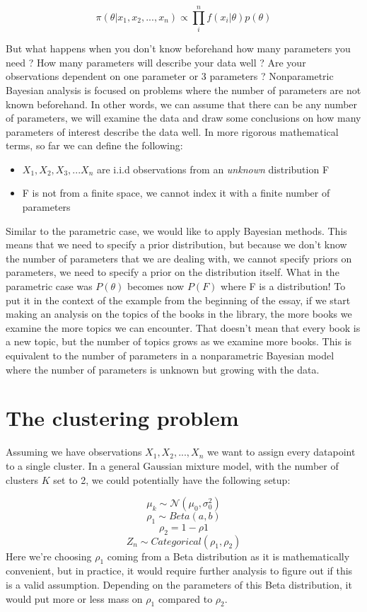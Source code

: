 \documentclass[12pt,a4paper]{article}
\begin{document}
$$\pi(\theta|x_{1}, x_{2}, ..., x_{n}) \propto \prod_{i}^{n}f(x_{i}|\theta)p(\theta)$$ 

But what happens when you don't know beforehand how many parameters you need ? How many parameters will describe
your data well ? Are your observations dependent on one parameter or 3 parameters ? Nonparametric Bayesian analysis
is focused on problems where the number of parameters are not known beforehand. In other words, we can assume that
there can be any number of parameters, we will examine the data and draw some conclusions on how many parameters of 
interest describe the data well. 
In more rigorous mathematical terms, so far we can define the following:

\begin{itemize}
    \item $X_{1}, X_{2}, X_{3}, ... X_{n}$ are i.i.d observations from an \textit{unknown} distribution F
    \item F is not from a finite space, we cannot index it with a finite number of parameters
\end{itemize}

Similar to the parametric case, we would like to apply Bayesian methods. This means that we need to 
specify a prior distribution, but because we don't know the number of parameters that we are dealing with,
we cannot specify priors on parameters, we need to specify a prior on the distribution itself. What in 
the parametric case was $P(\theta)$ becomes now $P(F)$ where F is a distribution! 
To put it in the context of the example from the beginning of the essay, if we start making an analysis on
the topics of the books in the library, the more books we examine the more topics we can encounter. That doesn't
mean that every book is a new topic, but the number of topics grows as we examine more books. This is equivalent
to the number of parameters in a nonparametric Bayesian model where the number of parameters is unknown but growing
with the data. 

\section{The clustering problem}
Assuming we have observations $X_{1}, X_{2}, ..., X_{n}$ we want to assign every datapoint to a single cluster. In a general Gaussian mixture model, with the number of clusters $K$ set to 2, we could potentially have the following setup: 

$$\mu_{k} \sim \mathcal{N}(\mu_{0}, \sigma_{0}^2)$$ 
$$\rho_{1} \sim Beta(a, b)$$
$$\rho_{2} = 1 - \rho{1}$$ 
$$Z_{n} \sim Categorical(\rho_{1}, \rho_{2})$$
Here we're choosing $\rho_{1}$ coming from a Beta distribution as it is mathematically convenient, but in practice, it would require further analysis to figure out if this is a valid assumption. Depending on the parameters of this Beta distribution, it would put more or less mass on $\rho_{1}$ compared to $\rho_{2}$.
\end{document}
